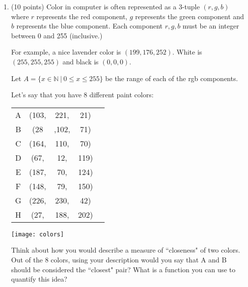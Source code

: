 \documentclass[10pt,letterpaper,unboxed,cm]{article}
\begin{document}
\begin{enumerate}
$$cossim((-1,1,-1,0,1,0),(1,0,0,1,-1,1)) =$$
$$ \frac{dot((-1,1,-1,0,1,0),(1,0,0,1,-1,1))}{\sqrt{dot((-1,1,-1,0,1,0),(-1,1,-1,0,1,0)})\sqrt{dot((1,0,0,1,-1,1),(1,0,0,1,-1,1))}}=$$
$$\frac{-2}{\sqrt{4}\sqrt{4}}=-1/2$$


\begin{quote}
{\bf Exercise 4:} (3 points)

Compute the cosine similarity of Squid Game and Tiger King (you can use your calculation from the previous exercise.)
\end{quote}


The distance function and the cosine similarity function are two different ways to measure how similar two user ratings are.

\begin{quote}
{\bf Exercise 5:} (for fair effort completeness:) (1 point)

In your own words, what are the differences and similarities of these two functions? Which one do you like better for the task of comparing two titles and why?
\end{quote}

\item (10 points)
Color in computer is often represented as a 3-tuple $(r,g,b)$ where $r$ represents the red component, $g$ represents the green component and $b$ represents the blue component. Each component $r,g,b$ must be an integer between 0 and 255 (inclusive.)

For example, a nice lavender color is $(199,176,252)$. White is $(255,255,255)$ and black is $(0,0,0)$.

Let $A=\{x\in\mathbb{N}~|~0\leq x\leq 255\}$ be the range of each of the rgb components.


Let's say that you have 8 different paint colors:

\begin{tabular}{ccccc}
A&(103,&221,&21)\\
B&(28&,102,&71)\\
C&(164,&110,&70)\\
D&(67,&12,&119)\\
E&(187,&70,&124)\\
F&(148,&79,&150)\\
G&(226,&230,&42)\\
H&(27,&188,&202)
\end{tabular}

\texttt{[image: colors]}

Think about how you would describe a measure of ``closeness" of two colors. Out of the 8 colors, using your description would you say that A and B should be considered the ``closest" pair? What is a function you can use to quantify this idea?



\end{enumerate}
\end{document}
